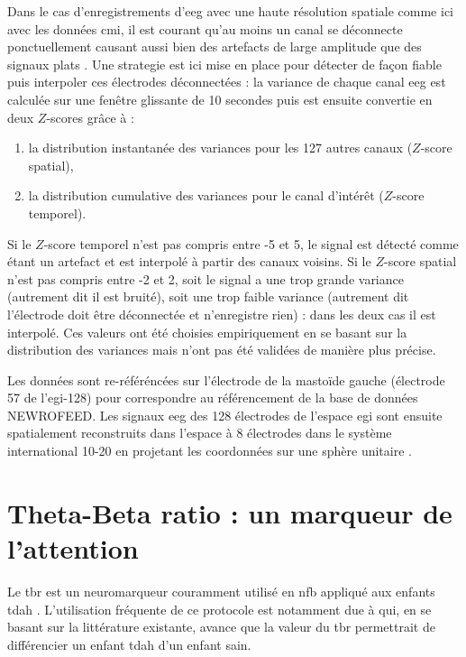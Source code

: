 Dans le cas d'enregistrements d'\gls{eeg} avec une haute résolution spatiale comme ici avec les données \gls{cmi}, 
il est courant qu'au moins un canal se déconnecte ponctuellement causant aussi bien des artefacts de large amplitude que des signaux plats \citep{Barlow1986, Oregan2013}. 
Une strategie est ici mise en place pour détecter de façon fiable puis interpoler ces électrodes déconnectées : la variance de chaque canal 
\gls{eeg} est calculée sur une fenêtre glissante de 10 secondes puis est ensuite convertie en deux $Z$-scores grâce à :
\begin{enumerate}
\item la distribution instantanée des variances pour les 127 autres canaux ($Z$-score spatial),
\item la distribution cumulative des variances pour le canal d'intérêt ($Z$-score temporel).
\end{enumerate}
Si le $Z$-score temporel n'est pas compris entre -5 et 5, le signal est détecté comme étant un artefact et est interpolé à partir des canaux voisins.
Si le $Z$-score spatial n'est pas compris entre -2 et 2, soit le signal a une trop grande variance (autrement dit il est bruité), soit une trop faible
variance (autrement dit l'électrode doit être déconnectée et n'enregistre rien) : dans les deux cas il est interpolé. Ces valeurs ont été choisies
empiriquement en se basant sur la distribution des variances mais n'ont pas été validées de manière plus précise.  

Les données sont re-référéncées sur l'électrode de la mastoïde gauche (électrode 57 de l'\gls{egi}-128) pour correspondre au référencement de la base
de données NEWROFEED. Les signaux \gls{eeg} des 128 électrodes de l'espace \gls{egi} sont ensuite spatialement reconstruits dans l'espace à 8 électrodes 
dans le système international 10-20 en projetant les coordonnées sur une sphère unitaire \citep{Perrin1989}.


\section{Theta-Beta ratio : un marqueur de l'attention}

Le \gls{tbr} est un neuromarqueur couramment utilisé en \gls{nfb} appliqué aux enfants \gls{tdah} \citep{Arns2013}. L'utilisation fréquente de ce protocole est notamment due
à \citet{Lubar1991} qui, en se basant sur la littérature existante, avance que la valeur du \gls{tbr} permettrait de différencier un enfant \gls{tdah} d'un enfant sain.  

